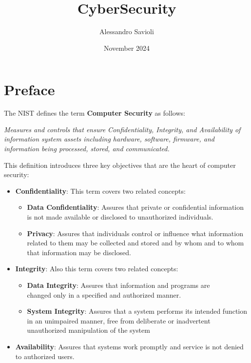 \documentclass{article}
\begin{document}
\title{CyberSecurity}
\author{Alessandro Savioli}
\date{November 2024}

\maketitle

\tableofcontents

\newpage

\section{Preface}

The NIST defines the term \textbf{Computer Security} as follows:

\begin{center}
    \textit{Measures and controls that ensure Confidentiality, Integrity, and
    Availability of information system assets including hardware, software,
    firmware, and information being processed, stored, and communicated.}
\end{center}

This definition introduces three key objectives that are the heart of computer
security:

\begin{itemize}
    \item \textbf{Confidentiality}: This term covers two related concepts:
    \begin{itemize}
        \item \textbf{Data Confidentiality}: Assures that private or
        confidential information is not made available or disclosed to
        unauthorized individuals.
        \item \textbf{Privacy}: Assures that individuals control or influence
        what information related to them may be collected and stored and by whom
        and to whom that information may be disclosed.
    \end{itemize}
    \item \textbf{Integrity}: Also this term covers two related concepts:
    \begin{itemize}
        \item \textbf{Data Integrity}: Assures that information and programs are
        \\ changed only in a specified and authorized manner.
        \item \textbf{System Integrity}: Assures that a system performs its
        intended function in an unimpaired manner, free from deliberate or
        inadvertent unauthorized manipulation of the system
    \end{itemize}
    \item \textbf{Availability}: Assures that systems work promptly and service
    is not denied to authorized users.
\end{itemize}
\end{document}
